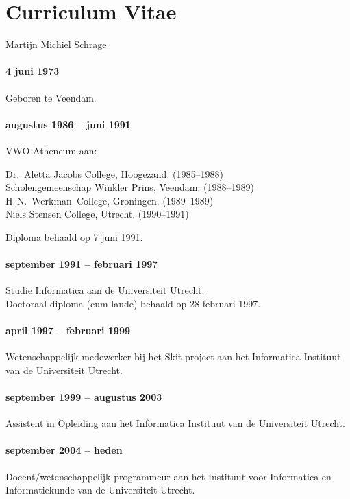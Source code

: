 \chapter*{Curriculum Vitae}
\label{chap:cv}

Martijn Michiel Schrage

\subsubsection*{4 juni 1973}
Geboren te Veendam.

\subsubsection*{augustus 1986 -- juni 1991}

VWO-Atheneum aan:

Dr.~Aletta Jacobs College, Hoogezand. (1985--1988)\\
Scholengemeenschap Winkler Prins, Veendam. (1988--1989)\\
H.\,N.~Werkman~College, Groningen. (1989--1989)\\
Niels Stensen College, Utrecht. (1990--1991)

Diploma behaald op 7 juni 1991.

\subsubsection*{september 1991 -- februari 1997}
Studie Informatica aan de Universiteit Utrecht.\\
Doctoraal diploma (cum laude) behaald op 28 februari 1997.

\subsubsection*{april 1997 -- februari 1999}
Wetenschappelijk medewerker bij het Skit-project aan het Informatica Instituut van de
Universiteit Utrecht.

\subsubsection*{september 1999 -- augustus 2003}
Assistent in Opleiding aan het Informatica Instituut van de
Universiteit Utrecht.

\subsubsection*{september 2004 -- heden}
Docent/wetenschappelijk programmeur aan het Instituut voor Informatica en Informatiekunde van de Universiteit Utrecht.